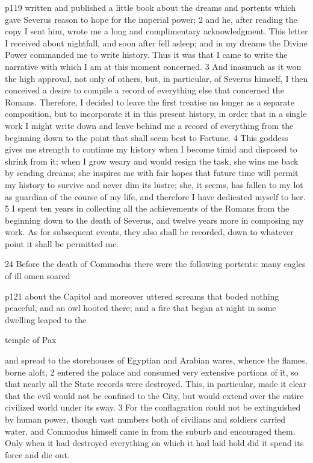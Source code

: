 p119 written and published a little book about the dreams and portents which gave Severus reason to hope for the imperial power; 2 and he, after reading the copy I sent him, wrote me a long and complimentary acknowledgment. This letter I received about nightfall, and soon after fell asleep; and in my dreams the Divine Power commanded me to write history. Thus it was that I came to write the narrative with which I am at this moment concerned. 3 And inasmuch as it won the high approval, not only of others, but, in particular, of Severus himself, I then conceived a desire to compile a record of everything else that concerned the Romans. Therefore, I decided to leave the first treatise no longer as a separate composition, but to incorporate it in this present history, in order that in a single work I might write down and leave behind me a record of everything from the beginning down to the point that shall seem best to Fortune. 4 This goddess gives me strength to continue my history when I become timid and disposed to shrink from it; when I grow weary and would resign the task, she wins me back by sending dreams; she inspires me with fair hopes that future time will permit my history to survive and never dim its lustre; she, it seems, has fallen to my lot as guardian of the course of my life, and therefore I have dedicated myself to her. 5 I spent ten years in collecting all the achievements of the Romans from the beginning down to the death of Severus, and twelve years more in composing my work. As for subsequent events, they also shall be recorded, down to whatever point it shall be permitted me.

24
Before the death of Commodus there were the following portents: many eagles of ill omen soared

p121 about the Capitol and moreover uttered screams that boded nothing peaceful, and an owl hooted there; and a fire that began at night in some dwelling leaped to the

temple of Pax

and spread to the storehouses of Egyptian and Arabian wares, whence the flames, borne aloft, 2 entered the palace and consumed very extensive portions of it, so that nearly all the State records were destroyed. This, in particular, made it clear that the evil would not be confined to the City, but would extend over the entire civilized world under its sway. 3 For the conflagration could not be extinguished by human power, though vast numbers both of civilians and soldiers carried water, and Commodus himself came in from the suburb and encouraged them. Only when it had destroyed everything on which it had laid hold did it spend its force and die out.

